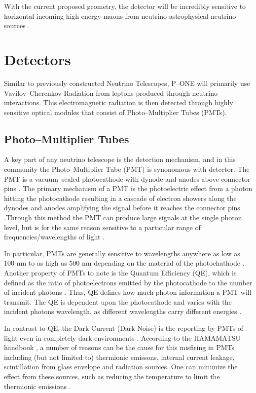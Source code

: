 With the current proposed geometry, the detector will be incredibly sensitive to horizontal incoming high energy muons from neutrino astrophysical neutrino sources \cite{pone}. 

\section{Detectors}
Similar to previously constructed Neutrino Telescopes, P--ONE will primarily use Vavilov--Cherenkov Radiation from leptons produced through neutrino interactions. This electromagnetic radiation is then detected through highly sensitive optical modules that consist of Photo--Multiplier Tubes (PMTs).

\subsection{Photo--Multiplier Tubes}

A key part of any neutrino telescope is the detection mechanism, and in this community the Photo--Multiplier Tube (PMT) is synonomous with detector. The PMT is a vacuum--sealed photocathode with dynode and anodes above connector pins \cite{ham}. The primary mechanism of a PMT is the photoelectric effect from a photon hitting the photocathode resulting in a cascade of electron showers along the dynodes and anodes amplifying the signal before it reaches the connector pins \cite{pmt_hist}.Through this method the PMT can produce large signals at the single photon level, but is for the same reason sensitive to a particular range of frequencies/wavelengths of light \cite{pmt_hist}.

In particular, PMTs are generally sensitive to wavelengths anywhere as low as 100 nm to as high as 500 nm depending on the material of the photochathode \cite{ham}. Another property of PMTs to note is the Quantum Efficiency (QE), which is defined as the ratio of photoelectrons emitted by the photocathode to the number of incident photons \cite{ham}. Thus, QE defines how much photon information a PMT will transmit. The QE is dependent upon the photocathode and varies with the incident photons wavelength, as different wavelengths carry different energies \cite{ham}.

In contrast to QE, the Dark Current (Dark Noise) is the reporting by PMTs of light even in completely dark environments \cite{ham}. According to the HAMAMATSU handbook \cite{ham}, a number of reasons can be the cause for this misfiring in PMTs including (but not limited to) thermionic emissons, internal current leakage, scintillation from glass envelope and radiation sources. One can minimize the effect from these sources, such as reducing the temperature to limit the thermionic emissions \cite{ham}.

